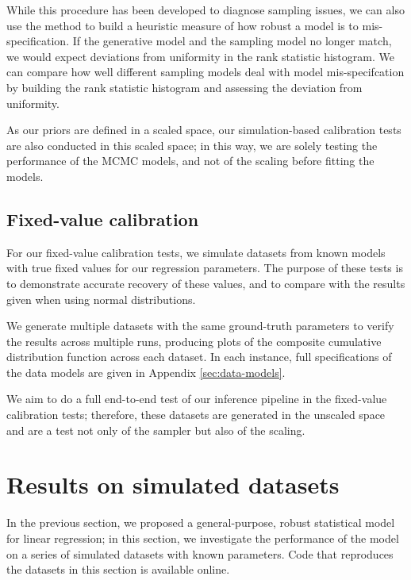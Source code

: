 \documentclass[fleqn,usenatbib]{rasti}
\begin{document}
While this procedure has been developed to diagnose sampling issues, we can also
use the method to build a heuristic measure of how robust a model is to
mis-specification. If the generative model and the sampling model no longer
match, we would expect deviations from uniformity in the rank statistic
histogram. We can compare how well different sampling models deal with model
mis-specifcation by building the rank statistic histogram and assessing the
deviation from uniformity.

As our priors are defined in a scaled space, our simulation-based calibration
tests are also conducted in this scaled space; in this way, we are solely
testing the performance of the MCMC models, and not of the scaling before
fitting the models.

\subsection{Fixed-value calibration}
\label{sec:methods.fixed}

For our fixed-value calibration tests, we simulate datasets from known models
with true fixed values for our regression parameters. The purpose of these tests
is to demonstrate accurate recovery of these values, and to compare with the
results given when using normal distributions.

We generate multiple datasets with the same ground-truth parameters to verify
the results across multiple runs, producing plots of the composite cumulative
distribution function across each dataset. In each instance, full specifications
of the data models are given in Appendix \ref{sec:data-models}.

We aim to do a full end-to-end test of our inference pipeline in the fixed-value
calibration tests; therefore, these datasets are generated in the unscaled space
and are a test not only of the sampler but also of the scaling.

\section{Results on simulated datasets}
\label{sec:results}

In the previous section, we proposed a general-purpose, robust statistical model
for linear regression; in this section, we investigate the performance of the
model on a series of simulated datasets with known parameters. Code that
reproduces the datasets in this section is available online\footnotemark.
\end{document}
